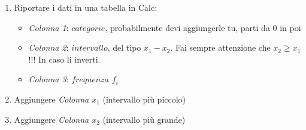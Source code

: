 \begin{enumerate}
    \item Riportare i dati in una tabella in Calc:
          \begin{itemize}
              \item \textit{Colonna 1}: $categorie$, probabilmente devi
                    aggiungerle tu, parti da 0 in poi
              \item \textit{Colonna 2}: $intervallo$, del tipo $x_1 - x_2$. Fai sempre
                    attenzione che $x_2 \ge x_1$ !!! In caso li inverti.
              \item  \textit{Colonna 3}: $frequenza$ $f_i$
          \end{itemize}
    \item Aggiungere \textit{Colonna $x_1$} (intervallo più piccolo)
    \item Aggiungere \textit{Colonna $x_2$} (intervallo più grande)


\end{enumerate}
